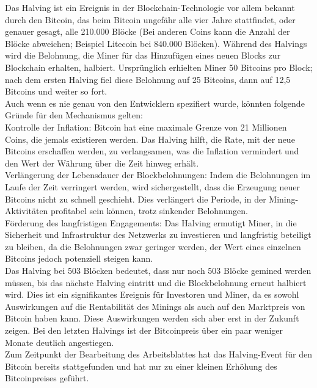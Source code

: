 \documentclass[german]{uebung}
\begin{document}
\begin{exercise}{1.2}
	Das Halving ist ein Ereignis in der Blockchain-Technologie vor allem bekannt durch den Bitcoin, das beim Bitcoin ungefähr alle vier Jahre stattfindet, oder genauer gesagt, alle 210.000 Blöcke (Bei anderen Coins kann die Anzahl der Blöcke abweichen; Beispiel Litecoin bei 840.000 Blöcken). Während des Halvings wird die Belohnung, die Miner für das Hinzufügen eines neuen Blocks zur Blockchain erhalten, halbiert. Ursprünglich erhielten Miner 50 Bitcoins pro Block; nach dem ersten Halving fiel diese Belohnung auf 25 Bitcoins, dann auf 12,5 Bitcoins und weiter so fort.\\
	Auch wenn es nie genau von den Entwicklern spezifiert wurde, könnten folgende Gründe für den Mechanismus gelten:\\
	Kontrolle der Inflation: Bitcoin hat eine maximale Grenze von 21 Millionen Coins, die jemals existieren werden. Das Halving hilft, die Rate, mit der neue Bitcoins erschaffen werden, zu verlangsamen, was die Inflation vermindert und den Wert der Währung über die Zeit hinweg erhält.\\
	Verlängerung der Lebensdauer der Blockbelohnungen: Indem die Belohnungen im Laufe der Zeit verringert werden, wird sichergestellt, dass die Erzeugung neuer Bitcoins nicht zu schnell geschieht. Dies verlängert die Periode, in der Mining-Aktivitäten profitabel sein können, trotz sinkender Belohnungen.\\
	Förderung des langfristigen Engagements: Das Halving ermutigt Miner, in die Sicherheit und Infrastruktur des Netzwerks zu investieren und langfristig beteiligt zu bleiben, da die Belohnungen zwar geringer werden, der Wert eines einzelnen Bitcoins jedoch potenziell steigen kann.\\
	Das Halving bei 503 Blöcken bedeutet, dass nur noch 503 Blöcke gemined werden müssen, bis das nächste Halving eintritt und die Blockbelohnung erneut halbiert wird. Dies ist ein signifikantes Ereignis für Investoren und Miner, da es sowohl Auswirkungen auf die Rentabilität des Minings als auch auf den Marktpreis von Bitcoin haben kann. Diese Auswirkungen werden sich aber erst in der Zukunft zeigen. Bei den letzten Halvings ist der Bitcoinpreis über ein paar weniger Monate deutlich angestiegen.\\
	Zum Zeitpunkt der Bearbeitung des Arbeitsblattes hat das Halving-Event für den Bitcoin bereits stattgefunden und hat nur zu einer kleinen Erhöhung des Bitcoinpreises geführt.
\end{exercise}
\end{document}
